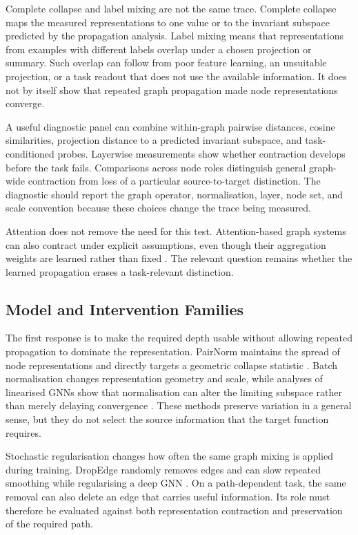 Complete collapse and label mixing are not the same trace.
Complete collapse maps the measured representations to one value or to the invariant subspace predicted by the propagation analysis.
Label mixing means that representations from examples with different labels overlap under a chosen projection or summary.
Such overlap can follow from poor feature learning, an unsuitable projection, or a task readout that does not use the available information.
It does not by itself show that repeated graph propagation made node representations converge.

A useful diagnostic panel can combine within-graph pairwise distances, cosine similarities, projection distance to a predicted invariant subspace, and task-conditioned probes.
Layerwise measurements show whether contraction develops before the task fails.
Comparisons across node roles distinguish general graph-wide contraction from loss of a particular source-to-target distinction.
The diagnostic should report the graph operator, normalisation, layer, node set, and scale convention because these choices change the trace being measured.

Attention does not remove the need for this test.
Attention-based graph systems can also contract under explicit assumptions, even though their aggregation weights are learned rather than fixed \cite{wu2023demystifying}.
The relevant question remains whether the learned propagation erases a task-relevant distinction.

\subsection{Model and Intervention Families}

The first response is to make the required depth usable without allowing repeated propagation to dominate the representation.
PairNorm maintains the spread of node representations and directly targets a geometric collapse statistic \cite{zhao2020pairnorm}.
Batch normalisation changes representation geometry and scale, while analyses of linearised GNNs show that normalisation can alter the limiting subspace rather than merely delaying convergence \cite{ioffe2015batch,scholkemper2025residual}.
These methods preserve variation in a general sense, but they do not select the source information that the target function requires.

Stochastic regularisation changes how often the same graph mixing is applied during training.
DropEdge randomly removes edges and can slow repeated smoothing while regularising a deep GNN \cite{rong2020dropedge}.
On a path-dependent task, the same removal can also delete an edge that carries useful information.
Its role must therefore be evaluated against both representation contraction and preservation of the required path.

